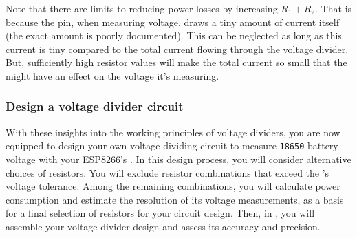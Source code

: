 Note that there are limits to reducing power losses by increasing $R_1+R_2$.
That is because the \adc pin, when measuring voltage, draws a tiny amount of current itself (the exact amount is poorly documented).
This can be neglected as long as this current is tiny compared to the total current flowing through the voltage divider.
But, sufficiently high resistor values will make the total current so small that the \adc might have an effect on the voltage it's measuring.

\subsubsection{\howto Design a voltage divider circuit}
With these insights into the working principles of voltage dividers, you are now equipped to design your own voltage dividing circuit to measure \texttt{18650} battery voltage with your ESP8266's \adc.
In this design process, you will consider alternative choices of resistors.
You will exclude resistor combinations that exceed the \adc's voltage tolerance.
Among the remaining combinations, you will calculate power consumption and estimate the resolution %
of its voltage measurements, as a basis for a final selection of resistors for your circuit design.
Then, in , you will assemble your voltage divider design and assess its accuracy and precision.
